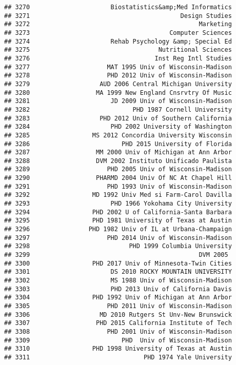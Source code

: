 \documentclass[
]{article}
\begin{document}
\begin{verbatim}
## 3270                      Biostatistics&amp;Med Informatics
## 3271                                         Design Studies
## 3272                                              Marketing
## 3273                                      Computer Sciences
## 3274                      Rehab Psychology &amp; Special Ed
## 3275                                   Nutritional Sciences
## 3276                                  Inst Reg Intl Studies
## 3277                     MAT 1995 Univ of Wisconsin-Madison
## 3278                     PHD 2012 Univ of Wisconsin-Madison
## 3279                   AUD 2006 Central Michigan University
## 3280                  MA 1999 New England Cnsrvtry Of Music
## 3281                      JD 2009 Univ of Wisconsin-Madison
## 3282                            PHD 1987 Cornell University
## 3283                   PHD 2012 Univ of Southern California
## 3284                      PHD 2002 University of Washington
## 3285                 MS 2012 Concordia University Wisconsin
## 3286                         PHD 2015 University of Florida
## 3287                  MM 2000 Univ of Michigan at Ann Arbor
## 3288                  DVM 2002 Instituto Unificado Paulista
## 3289                     PHD 2005 Univ of Wisconsin-Madison
## 3290                  PHARMD 2004 Univ Of NC At Chapel Hill
## 3291                     PHD 1993 Univ of Wisconsin-Madison
## 3292                 MD 1992 Univ Med si Farm-Carol Davilla
## 3293                      PHD 1966 Yokohama City University
## 3294                 PHD 2002 U of California-Santa Barbara
## 3295                 PHD 1981 University of Texas at Austin
## 3296                PHD 1982 Univ of IL at Urbana-Champaign
## 3297                     PHD 2014 Univ of Wisconsin-Madison
## 3298                           PHD 1999 Columbia University
## 3299                                              DVM 2005 
## 3300                 PHD 2017 Univ of Minnesota-Twin Cities
## 3301                      DS 2010 ROCKY MOUNTAIN UNIVERSITY
## 3302                      MS 1988 Univ of Wisconsin-Madison
## 3303                      PHD 2013 Univ of California Davis
## 3304                 PHD 1992 Univ of Michigan at Ann Arbor
## 3305                     PHD 2011 Univ of Wisconsin-Madison
## 3306                   MD 2010 Rutgers St Unv-New Brunswick
## 3307                  PHD 2015 California Institute of Tech
## 3308                     PHD 2001 Univ of Wisconsin-Madison
## 3309                         PHD  Univ of Wisconsin-Madison
## 3310                 PHD 1998 University of Texas at Austin
## 3311                               PHD 1974 Yale University

\end{verbatim}
\end{document}
